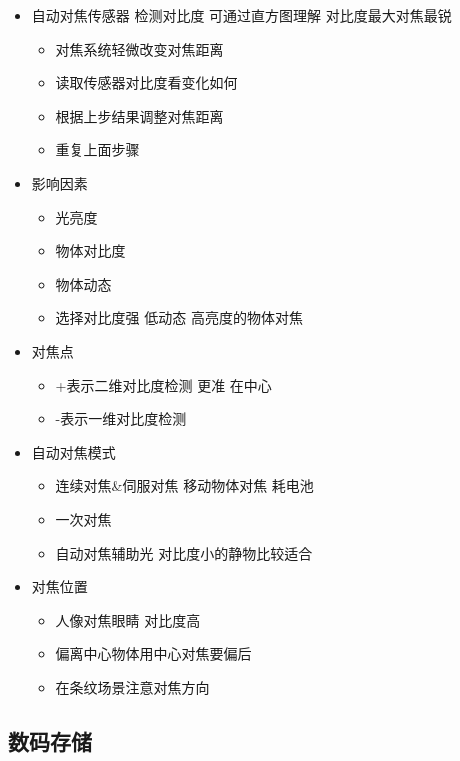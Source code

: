\documentclass[
  letterpaper,
  DIV=11,
  numbers=noendperiod]{scrreprt}
\providecommand{\tightlist}{%
  \setlength{\itemsep}{0pt}\setlength{\parskip}{0pt}}\usepackage{longtable,booktabs,array}
\begin{document}
\begin{itemize}
\tightlist
\item
  自动对焦传感器 检测对比度 可通过直方图理解 对比度最大对焦最锐

  \begin{itemize}
  \tightlist
  \item
    对焦系统轻微改变对焦距离
  \item
    读取传感器对比度看变化如何
  \item
    根据上步结果调整对焦距离
  \item
    重复上面步骤
  \end{itemize}
\item
  影响因素

  \begin{itemize}
  \tightlist
  \item
    光亮度
  \item
    物体对比度
  \item
    物体动态
  \item
    选择对比度强 低动态 高亮度的物体对焦
  \end{itemize}
\item
  对焦点

  \begin{itemize}
  \tightlist
  \item
    +表示二维对比度检测 更准 在中心
  \item
    -表示一维对比度检测
  \end{itemize}
\item
  自动对焦模式

  \begin{itemize}
  \tightlist
  \item
    连续对焦\&伺服对焦 移动物体对焦 耗电池
  \item
    一次对焦
  \item
    自动对焦辅助光 对比度小的静物比较适合
  \end{itemize}
\item
  对焦位置

  \begin{itemize}
  \tightlist
  \item
    人像对焦眼睛 对比度高
  \item
    偏离中心物体用中心对焦要偏后
  \item
    在条纹场景注意对焦方向
  \end{itemize}
\end{itemize}

\subsection{数码存储}\label{ux6570ux7801ux5b58ux50a8}
\end{document}
